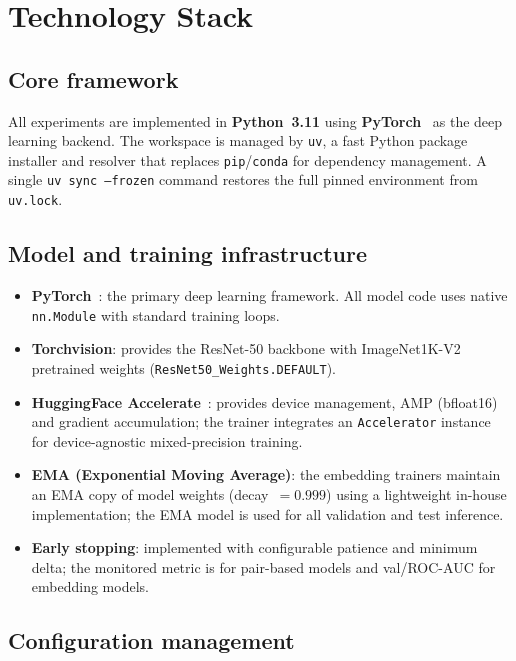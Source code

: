 \section{Technology Stack}
\label{app:technology}

\subsection{Core framework}

All experiments are implemented in \textbf{Python~3.11} using
\textbf{PyTorch}~\cite{pytorch2019} as the deep learning backend.
The workspace is managed by \texttt{uv}, a fast Python package installer and resolver that
replaces \texttt{pip}/\texttt{conda} for dependency management.
A single \texttt{uv sync --frozen} command restores the full pinned environment from
\texttt{uv.lock}.

\subsection{Model and training infrastructure}

\begin{itemize}[itemsep=2pt]
  \item \textbf{PyTorch}~\cite{pytorch2019}: the primary deep learning framework.
        All model code uses native \texttt{nn.Module} with standard training loops.
  \item \textbf{Torchvision}: provides the ResNet-50 backbone with
        ImageNet1K-V2 pretrained weights (\texttt{ResNet50\_\allowbreak Weights.DEFAULT}).
  \item \textbf{HuggingFace Accelerate}~\cite{huang2022accelerate}: provides
        device management, AMP (bfloat16) and gradient accumulation;
        the trainer integrates an \texttt{Accelerator} instance for
        device-agnostic mixed-precision training.
  \item \textbf{EMA (Exponential Moving Average)}: the embedding trainers maintain an
        EMA copy of model weights (decay~$= 0.999$) using a lightweight in-house
        implementation; the EMA model is used for all validation and test inference.
  \item \textbf{Early stopping}: implemented with configurable patience and minimum delta;
        the monitored metric is \recall for pair-based models and val/ROC-AUC for
        embedding models.
\end{itemize}

\subsection{Configuration management}

